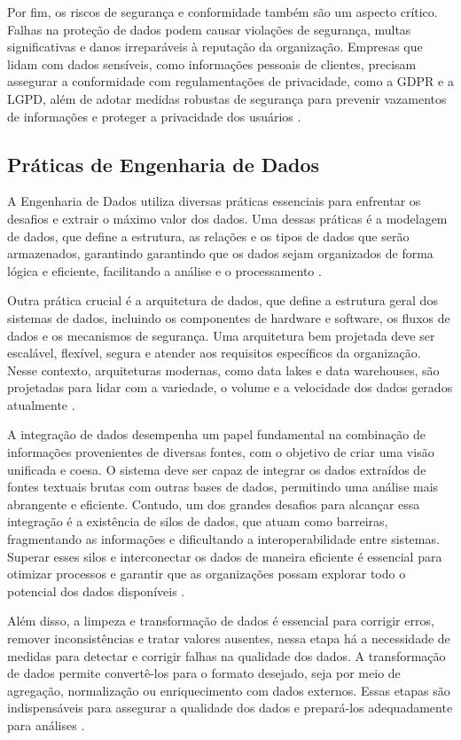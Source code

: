Por fim, os riscos de segurança e conformidade também são um aspecto crítico. Falhas na proteção de dados podem causar 
violações de segurança, multas significativas e danos irreparáveis à reputação da organização. Empresas que lidam com 
dados sensíveis, como informações pessoais de clientes, precisam assegurar a conformidade com regulamentações de 
privacidade, como a GDPR e a LGPD, além de adotar medidas robustas de segurança para prevenir vazamentos de informações e 
proteger a privacidade dos usuários \cite{benfeldt2020data}.

\subsection{Práticas de Engenharia de Dados}
A Engenharia de Dados utiliza diversas práticas essenciais para enfrentar os desafios e extrair o máximo valor 
dos dados. Uma dessas práticas é a modelagem de dados, que define a estrutura, as relações e os tipos de dados 
que serão armazenados, garantindo garantindo que os dados sejam organizados de forma lógica e eficiente, 
facilitando a análise e o processamento \cite{volk2019challenging}.

Outra prática crucial é a arquitetura de dados, que define a estrutura geral dos sistemas de dados, incluindo os 
componentes de hardware e software, os fluxos de dados e os mecanismos de segurança. Uma arquitetura bem projetada 
deve ser escalável, flexível, segura e atender aos requisitos específicos da organização. Nesse contexto, arquiteturas 
modernas, como data lakes e data warehouses, são projetadas para lidar com a variedade, o volume e a velocidade dos 
dados gerados atualmente \cite{volk2019challenging}.

A integração de dados desempenha um papel fundamental na combinação de informações provenientes de diversas fontes, 
com o objetivo de criar uma visão unificada e coesa. O sistema deve ser capaz de integrar os dados extraídos de 
fontes textuais brutas com outras bases de dados, permitindo uma análise mais abrangente e eficiente. Contudo, 
um dos grandes desafios para alcançar essa integração é a existência de silos de dados, que atuam como barreiras, 
fragmentando as informações e dificultando a interoperabilidade entre sistemas. Superar esses silos e interconectar 
os dados de maneira eficiente é essencial para otimizar processos e garantir que as organizações possam explorar 
todo o potencial dos dados disponíveis \cite{doan2008information}.

Além disso, a limpeza e transformação de dados é essencial para corrigir erros, remover inconsistências e tratar 
valores ausentes, nessa etapa há a necessidade de medidas para detectar e corrigir falhas na qualidade dos dados. 
A transformação de dados permite convertê-los para o formato desejado, seja por meio de agregação, normalização 
ou enriquecimento com dados externos. Essas etapas são indispensáveis para assegurar a qualidade dos dados e 
prepará-los adequadamente para análises \cite{impact_poor_data_1998}.

